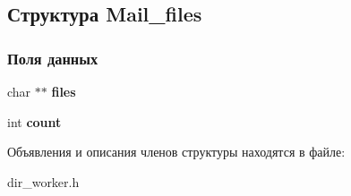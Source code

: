 \hypertarget{structMail__files}{}\subsection{Структура Mail\+\_\+files}
\label{structMail__files}
\subsubsection*{Поля данных}
\begin{DoxyCompactItemize}
\item 
char $\ast$$\ast$ {\bfseries files}\hypertarget{structMail__files_a112085662d3f65173537def00966edf2}{}\label{structMail__files_a112085662d3f65173537def00966edf2}

\item 
int {\bfseries count}\hypertarget{structMail__files_a04592c186a50405a47e19b60334fba0e}{}\label{structMail__files_a04592c186a50405a47e19b60334fba0e}

\end{DoxyCompactItemize}


Объявления и описания членов структуры находятся в файле\+:\begin{DoxyCompactItemize}
\item 
dir\+\_\+worker.\+h\end{DoxyCompactItemize}
